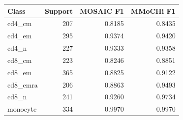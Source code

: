 \begin{tabular}{lrrr}
\toprule
Class & Support & MOSAIC F1 & MMoCHi F1 \\
\midrule
cd4\_cm & 207 & 0.8185 & 0.8435 \\
cd4\_em & 295 & 0.9374 & 0.9420 \\
cd4\_n & 227 & 0.9333 & 0.9358 \\
cd8\_cm & 223 & 0.8246 & 0.8851 \\
cd8\_em & 365 & 0.8825 & 0.9122 \\
cd8\_emra & 206 & 0.8863 & 0.9493 \\
cd8\_n & 241 & 0.9260 & 0.9734 \\
monocyte & 334 & 0.9970 & 0.9970 \\
\bottomrule
\end{tabular}
